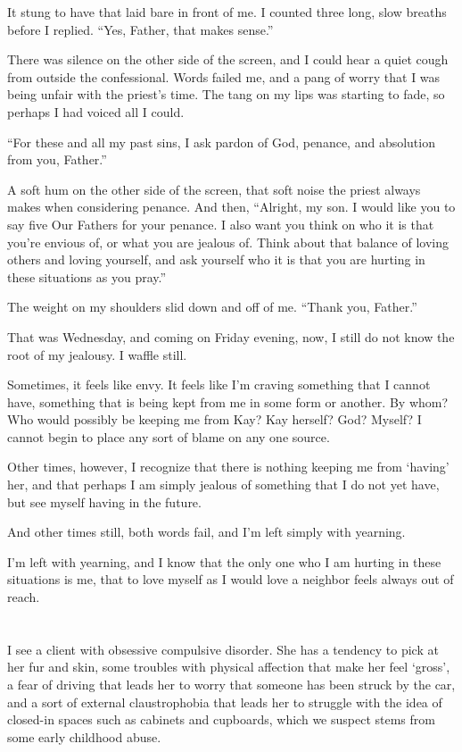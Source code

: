 It stung to have that laid bare in front of me. I counted three long, slow breaths before I replied. ``Yes, Father, that makes sense.''

There was silence on the other side of the screen, and I could hear a quiet cough from outside the confessional. Words failed me, and a pang of worry that I was being unfair with the priest's time. The tang on my lips was starting to fade, so perhaps I had voiced all I could.

``For these and all my past sins, I ask pardon of God, penance, and absolution from you, Father.''

A soft hum on the other side of the screen, that soft noise the priest always makes when considering penance. And then, ``Alright, my son. I would like you to say five Our Fathers for your penance. I also want you think on who it is that you're envious of, or what you are jealous of. Think about that balance of loving others and loving yourself, and ask yourself who it is that you are hurting in these situations as you pray.''

The weight on my shoulders slid down and off of me. ``Thank you, Father.''

That was Wednesday, and coming on Friday evening, now, I still do not know the root of my jealousy. I waffle still.

Sometimes, it feels like envy. It feels like I'm craving something that I cannot have, something that is being kept from me in some form or another. By whom? Who would possibly be keeping me from Kay? Kay herself? God? Myself? I cannot begin to place any sort of blame on any one source.

Other times, however, I recognize that there is nothing keeping me from `having' her, and that perhaps I am simply jealous of something that I do not yet have, but see myself having in the future.

And other times still, both words fail, and I'm left simply with yearning.

I'm left with yearning, and I know that the only one who I am hurting in these situations is me, that to love myself as I would love a neighbor feels always out of reach.

\section{}

I see a client with obsessive compulsive disorder. She has a tendency to pick at her fur and skin, some troubles with physical affection that make her feel `gross', a fear of driving that leads her to worry that someone has been struck by the car, and a sort of external claustrophobia that leads her to struggle with the idea of closed-in spaces such as cabinets and cupboards, which we suspect stems from some early childhood abuse.

